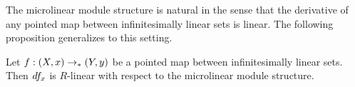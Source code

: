 
The microlinear module structure is natural in the sense that the derivative of any pointed map between infinitesimally linear sets is linear.
The following proposition generalizes \cite[Lemma 2.2.6]{diffgeo-article} to this setting.

\begin{proposition}\label{prp:derivative-inf-lin}
  Let $f : (X,x) \to_{\ast} (Y,y)$ be a pointed map between infinitesimally linear sets.
  Then $df_x$ is $R$-linear with respect to the microlinear module structure.
\end{proposition}

